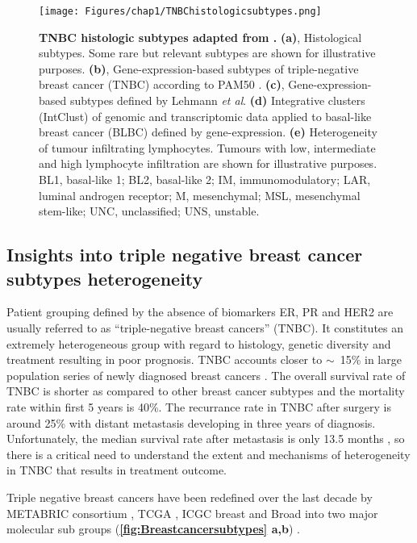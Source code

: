 
\begin{figure}
\centering
\texttt{[image: Figures/chap1/TNBChistologicsubtypes.png]}
	\caption[TNBC histologic subtypes adapted from  \cite{bianchini2016triple} ]
	{\small
	    \textbf{TNBC histologic subtypes adapted from \cite{bianchini2016triple}.}
	    \textbf{(a)}, Histological subtypes. Some rare but relevant subtypes are shown for
illustrative purposes.
	    \textbf{(b)}, Gene-expression-based subtypes of triple-negative breast cancer (TNBC) according to PAM50 \cite{prat2013molecular}.
	    \textbf{(c)}, Gene-expression-based subtypes defined by Lehmann \textit{et al}.\cite{lehmann2011identification}
	     \textbf{(d)} Integrative clusters (IntClust) of genomic and transcriptomic data applied to basal-like breast cancer (BLBC) defined by gene-expression.
	     \textbf{(e)} Heterogeneity of tumour infiltrating lymphocytes. Tumours with low, intermediate and high lymphocyte infiltration are shown for illustrative
purposes. BL1, basal-like 1; BL2, basal-like 2; IM, immunomodulatory; LAR, luminal androgen receptor; M, mesenchymal;
MSL, mesenchymal stem-like; UNC, unclassified; UNS, unstable.
	}
	\label{fig:TNBChistologicsubtypes}
\end{figure}
\subsection{Insights into triple negative breast cancer subtypes heterogeneity}
Patient grouping defined by the absence of biomarkers ER, PR and HER2 are usually referred to as ``triple-negative breast cancers'' (TNBC). It constitutes an extremely heterogeneous group with regard to histology, genetic diversity and treatment resulting in poor prognosis. TNBC accounts  closer to $\sim$~15\% in large population series of newly diagnosed breast cancers \cite{reis2008triple}.
The overall survival rate of TNBC is shorter as compared to other breast cancer subtypes and the mortality rate within first 5 years is 40\%. The recurrance rate in TNBC after surgery is  around 25\% with distant metastasis developing in three years of diagnosis. Unfortunately, the median survival rate after metastasis is only 13.5 months \cite{dent2007triple,lin2008sites}, so there is a critical need to understand the extent and mechanisms of heterogeneity in TNBC that results in treatment outcome. 

Triple negative breast cancers have been redefined over the last decade by METABRIC consortium \cite{curtis2012genomic, dvinge2013shaping, pereira2016somatic, dawson2013new, bilal2013improving}, TCGA \cite{weinstein2013cancer}, ICGC breast \cite{international2010international} and Broad \cite{banerji2012sequence, rheinbay2017recurrent} into two major molecular sub groups (\textbf{\autoref{fig:Breastcancersubtypes} a,b}) \cite{xu2014omics}.

